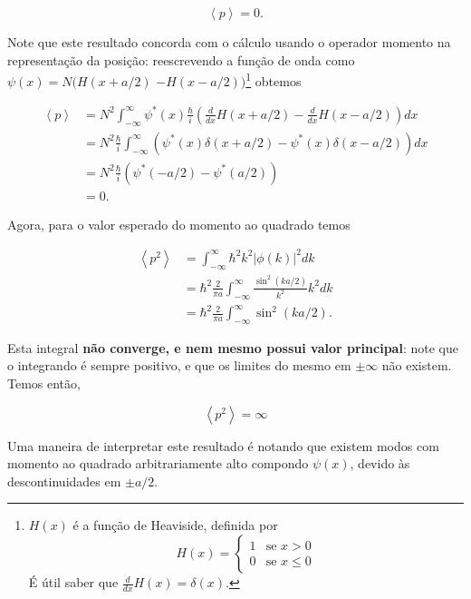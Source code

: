\documentclass[a4paper, 12pt, notitlepage]{article}
\begin{document}
\begin{enumerate}
\begin{enumerate}
    \begin{equation*} \left\langle p \right \rangle = 0. \end{equation*}
    
    Note que este resultado concorda com o cálculo usando o operador momento na representação da posição: reescrevendo a função de onda como $\psi(x) = N(H(x + a/2)$ $- H(x - a/2))$\footnote{$H(x)$ é a função de Heaviside, definida por 
    $$H(x) = \begin{cases} 1&\text{se }x > 0\\0&\text{se } x \le 0 \end{cases}$$
    É útil saber que $\frac{d}{dx} H(x) = \delta(x)$.} obtemos
    
    \begin{align*}
    \left\langle p \right\rangle &= N^2\int_{-\infty}^{\infty} \psi^{\ast}(x) \frac{\hbar}{i}\left( \frac{d}{dx} H(x+a/2) - \frac{d}{dx} H(x- a/2)\right) dx \\
    &= N^2 \frac{\hbar}{i} \int_{-\infty}^{\infty}\left( \psi^{\ast}(x) \delta(x+a/2) -  \psi^{\ast}(x) \delta(x - a/2)\right) dx \\
    &= N^2\frac{\hbar}{i} \left(\psi^{\ast}(-a/2) - \psi^{\ast}(a/2)\right) \\
    &= 0.
    \end{align*}
    
    Agora, para o valor esperado do momento ao quadrado temos
    
    \begin{align*}
      \left\langle p^2 \right\rangle &= \int_{-\infty}^{\infty}\hbar^2 k^2 |\phi(k)|^2 dk \\
      &= \hbar^2 \frac{2}{\pi a} \int_{-\infty}^{\infty} \frac{\sin^2\left(ka/2\right)}{k^2} k^2 dk \\
      &= \hbar^2 \frac{2}{\pi a} \int_{-\infty}^{\infty} \sin^2\left(ka/2\right).
    \end{align*}
    
    Esta integral \textbf{não converge, e nem mesmo possui valor principal}: note que o integrando é sempre positivo, e que os limites do mesmo em $\pm \infty$ não existem. Temos então,
    
    \begin{equation*}
    \left\langle p^2 \right\rangle = \infty
    \end{equation*}
        
    Uma maneira de interpretar este resultado é notando que existem modos com momento ao quadrado arbitrariamente alto compondo $\psi(x)$, devido às descontinuidades em $\pm a/2$.
    

\end{enumerate}
\end{enumerate}
\end{document}
